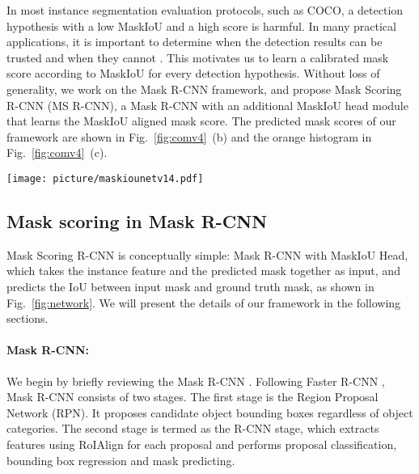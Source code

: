 \documentclass[10pt,twocolumn,letterpaper]{article}
\begin{document}
    In most instance segmentation evaluation protocols, such as COCO, a detection hypothesis with a low MaskIoU and a high score is harmful. In many practical applications, it is important to determine when the detection results can be trusted and when they cannot \cite{relatedsoftmax_fromvgg}.
    This motivates us to learn a calibrated mask score according to MaskIoU for every detection hypothesis. Without loss of generality, we work on the Mask R-CNN framework, and propose Mask Scoring R-CNN (MS R-CNN), a Mask R-CNN with an additional MaskIoU head module that learns the MaskIoU aligned mask score. The predicted mask scores of our framework are shown in Fig.~\ref{fig:comv4}~(b) and the orange histogram in Fig.~\ref{fig:comv4}~(c). 
 






   


\begin{figure*}[ht]
\centering
\texttt{[image: picture/maskiounetv14.pdf]}
\caption{Network architecture of Mask Scoring R-CNN. The input image is fed into a backbone network to generate RoIs via RPN and RoI features via RoIAlign. The RCNN head and Mask head are standard components of Mask R-CNN. For predicting MaskIoU, we use the predicted mask and RoI feature as input. The MaskIoU head has 4 convolution layers (all have kernel=3 and the final one uses stride=2 for downsampling) and 3 fully connected layers (the final one outputs  classes MaskIoU.) }
\label{fig:network}
\end{figure*}   

\subsection{Mask scoring in Mask R-CNN}


    Mask Scoring R-CNN is conceptually simple: Mask R-CNN with MaskIoU Head, which takes the instance feature and the predicted mask together as input, and predicts the IoU between input mask and ground truth mask, as shown in Fig.~\ref{fig:network}. We will present the details of our framework in the following sections. 


  
\vspace{-2mm}    
    \paragraph{Mask R-CNN:} We begin by briefly reviewing the Mask R-CNN \cite{he2017maskrcnn}. Following Faster R-CNN \cite{ren2015faster}, Mask R-CNN consists of two stages. The first stage is the Region Proposal Network (RPN). It proposes candidate object bounding boxes regardless of object categories. The second stage is termed as the R-CNN stage, which extracts features using RoIAlign for each proposal and performs proposal classification, bounding box regression and mask predicting. 
 
\end{document}
